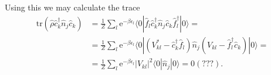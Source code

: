 \documentclass[english, parskip=full]{scrartcl}
\renewcommand{\braket}{}
\newcommand{\kla}{}
\newcommand{\tecxt}{}
\newcommand{\e}{\text{e}}
\begin{document}
Using this we may calculate the trace 
\begin{align}
\tecxt\text{tr}\kla\left( \hat{\rho} \hat{c}_k^\dagger \hat{n}_j \hat{c}_k \right) &= \frac{1}{Z} \sum_l \e^{-\beta\epsilon_l} \braket\langle 0 | \hat{f}_l \hat{c}_k^\dagger \hat{n}_j \hat{c}_k \hat{f}_l^\dagger | 0 \rangle = \\
&= \frac{1}{Z} \sum_l \e^{-\beta\epsilon_l} \braket\langle 0 | \kla\left(  V_{kl}^\ast - \hat{c}_k^\dagger \hat{f}_l \right) \hat{n}_j \kla\left( V_{kl} - \hat{f}_l^\dagger \hat{c}_k \right) | 0 \rangle = \\
&= \frac{1}{Z} \sum_l \e^{-\beta\epsilon_l} |V_{kl}|^2 \braket\langle 0 | \hat{n}_j | 0 \rangle = 0 (???).
\end{align}
\end{document}
